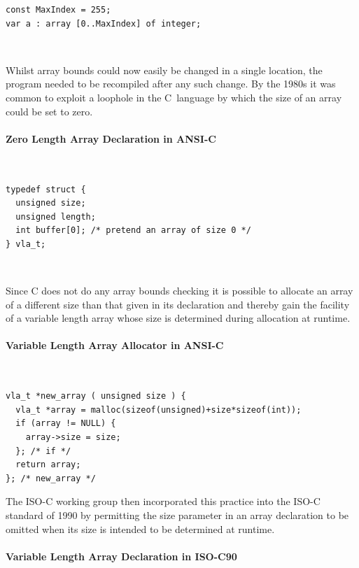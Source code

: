 \documentclass[10pt,a4paper]{article}
\newcommand\sourcecaption[1]{\noindent\normalfont\small\textsf{#1}}
\begin{document}
\lstset{style=pascal}
\begin{lstlisting}
const MaxIndex = 255;
var a : array [0..MaxIndex] of integer;
\end{lstlisting}~

\noindent Whilst array bounds could now easily be changed in a single
location, the program needed to be recompiled after any such change.
By the 1980s it was common to exploit a loophole in the C~language
by which the size of an array could be set to zero.

\paragraph{\sourcecaption{Zero Length Array Declaration in
ANSI-C \cite{ANSI-C}}}~

\lstset{style=C}
\begin{lstlisting}
typedef struct {
  unsigned size;
  unsigned length;
  int buffer[0]; /* pretend an array of size 0 */
} vla_t;
\end{lstlisting}~

\noindent Since C does not do any array bounds checking it is possible
to allocate an array of a different size than that given in its declaration
and thereby gain the facility of a variable length array whose size is
determined during allocation at runtime.

\paragraph{\sourcecaption{Variable Length Array Allocator in ANSI-C}}~

\lstset{style=C}
\begin{lstlisting}
vla_t *new_array ( unsigned size ) {
  vla_t *array = malloc(sizeof(unsigned)+size*sizeof(int));
  if (array != NULL) {
    array->size = size;
  }; /* if */
  return array;
}; /* new_array */
\end{lstlisting}

\noindent The ISO-C working group then incorporated this practice into the
ISO-C standard of 1990 by permitting the size parameter in an array declaration
to be omitted when its size is intended to be determined at runtime.

\paragraph{\sourcecaption{Variable Length Array Declaration in
ISO-C90 \cite{ISO-C}}}~
\end{document}
